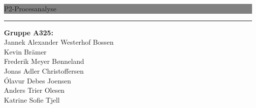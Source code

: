 \newcommand{\HRule}[1]{\hfill \rule{0.2\linewidth}{#1}} 

\thispagestyle{empty} 

\noindent \colorbox{grey}{
	 \parbox[t]{1.0\linewidth}{
		\centering \fontsize{50pt}{80pt}\selectfont
		\vspace*{0.7cm}
		P2-Procesanalyse \\[3pt]
		\vspace*{0.7cm}
	}
}

\vfill
\flushright
\flushright \rule[10pt]{0.1pt}{160pt}  \begin{minipage}[b]{0.45\linewidth}
{
\Large
\textbf{Gruppe A325:} \\[4pt]

Jannek Alexander Westerhof Bossen\\[.2cm]
Kevin Brämer\\[.2cm]
Frederik Meyer Bønneland\\[.2cm]
Jonas Adler Christoffersen\\[.2cm]
Ólavur Debes Joensen\\[.2cm]
Anders Trier Olesen\\[.2cm]
Katrine Sofie Tjell\\[.2cm]

}
\end{minipage}

\clearpage 
